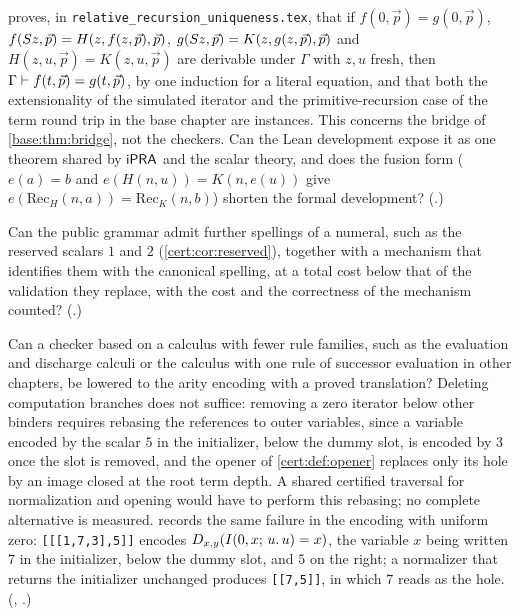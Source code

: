 \begin{question}
 proves, in \texttt{relative\_recursion\_uniqueness.tex},
that if $f(0,\vec p)=g(0,\vec p)$, $f(S z,\vec p)=H(z,f(z,\vec p),\vec p)$,
$g(S z,\vec p)=K(z,g(z,\vec p),\vec p)$ and $H(z,u,\vec p)=K(z,u,\vec p)$
are derivable under $\Gamma$ with $z,u$ fresh, then
$\Gamma\vdash f(t,\vec p)=g(t,\vec p)$, by one induction for a literal equation,
and that both the extensionality of the simulated iterator and the
primitive-recursion case of the term round trip in the base chapter are
instances. This concerns the bridge of \cref{base:thm:bridge}, not the
checkers. Can the Lean development expose it as one theorem shared by $\mathsf{iPRA}$
and the scalar theory, and does the fusion form ($e(a)=b$ and
$e(H(n,u))=K(n,e(u))$ give $e(\mathrm{Rec}_H(n,a))=\mathrm{Rec}_K(n,b)$) shorten
the formal development? (.)
\end{question}

\begin{question}
Can the public grammar admit further spellings of a numeral, such as the
reserved scalars $1$ and $2$ (\cref{cert:cor:reserved}), together with a
mechanism that identifies them with the canonical spelling, at a total cost
below that of the validation they replace, with the cost and the correctness
of the mechanism counted? (.)
\end{question}

\begin{question}
Can a checker based on a calculus with fewer rule families, such as the
evaluation and discharge calculi or the calculus with one rule of successor
evaluation in other chapters, be lowered to the arity encoding with a proved
translation? Deleting computation branches does not suffice: removing a zero
iterator below other binders requires rebasing the references to outer
variables, since a variable encoded by the scalar $5$ in the initializer, below
the dummy slot, is encoded by $3$ once the slot is removed, and the opener of
\cref{cert:def:opener} replaces only its hole by an image closed at the root
term depth. A shared certified traversal for normalization and opening would
have to perform this rebasing; no complete alternative is measured.
 records the same failure in the encoding with
uniform zero: \texttt{[[[1,7,3],5]]} encodes $D_{x,y}(I(0,x;\,u.\,u)=x)$, the variable
$x$ being written $7$ in the initializer, below the dummy slot, and $5$ on the right;
a normalizer that returns the initializer unchanged produces \texttt{[[7,5]]}, in which
$7$ reads as the hole. (,
.)
\end{question}

